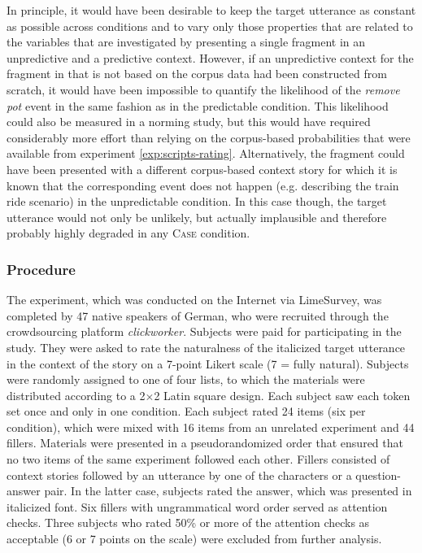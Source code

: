 In principle, it would have been desirable to keep the target utterance as constant as possible across conditions and to vary only those properties that are related to the variables that are investigated by presenting a single fragment in an unpredictive and a predictive context. However, if an unpredictive context for the fragment in \LLast[a] that is not based on the corpus data had been constructed from scratch, it would have been impossible to quantify the likelihood of the \textit{remove pot} event in the same fashion as in the predictable condition. This likelihood could also be measured in a norming study, but this would have required considerably more effort than relying on the corpus-based probabilities that were available from experiment \ref{exp:scripts-rating}. Alternatively, the fragment could have been presented with a different corpus-based context story for which it is known that the corresponding event does not happen (e.g. describing the train ride scenario) in the unpredictable condition. In this case though, the target utterance would not only be unlikely, but actually implausible and therefore probably highly degraded in any \textsc{Case} condition.

\subsubsection{Procedure}
The experiment, which was conducted on the Internet via LimeSurvey, was completed by 47 native speakers of German, who were recruited through the crowdsourcing platform \textit{clickworker}. Subjects were paid  for participating in the study. They were asked to rate the naturalness of the italicized target utterance in the context of the story on a 7-point Likert scale (7 = fully natural). Subjects were randomly assigned to one of four lists, to which the materials were distributed according to a 2$\times$2 Latin square design. Each subject saw each token set once and only in one condition. Each subject rated 24 items (six per condition), which were mixed with 16 items from an unrelated experiment and 44 fillers. Materials were presented in a pseudorandomized order that ensured that no two items of the same experiment followed each other. Fillers consisted of context stories followed by an utterance by one of the characters or a question-answer pair. In the latter case, subjects rated the answer, which was presented in italicized font. Six fillers with ungrammatical word order served as attention checks. Three subjects who rated 50\% or more of the attention checks as acceptable (6 or 7 points on the scale) were excluded from further analysis.

